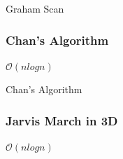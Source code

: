 \documentclass{beamer}
\begin{document}
\begin{frame}{Graham Scan}
    \begin{center}
    \end{center}
\end{frame}


\begin{frame}
    \frametitle{Chan's Algorithm}
    
    \begin{center}
    
        $\mathcal{O}(n log n)$
    \end{center}
\end{frame}

\begin{frame}{Chan's Algorithm}
\begin{center}
\end{center}
\end{frame}


\begin{frame}
    \frametitle{Jarvis March in 3D}
    
    \begin{center}
    
        $\mathcal{O}(n log n)$
    \end{center}
\end{frame}




    
    

 
    

\end{document}
